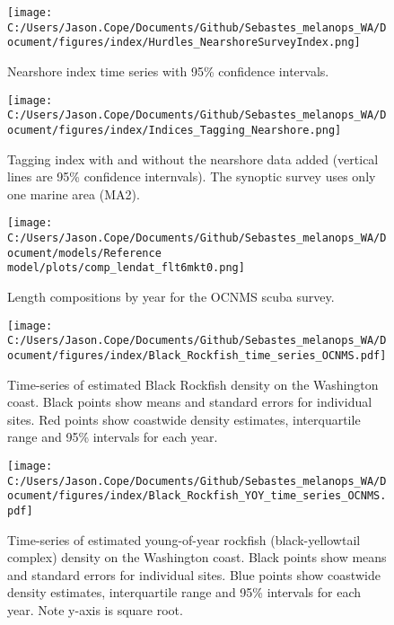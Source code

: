 \documentclass[11pt,
  letterpaper,
]{article}
\begin{document}
\pagebreak

\begin{figure}
{\centering
\texttt{[image: C:/Users/Jason.Cope/Documents/Github/Sebastes\_melanops\_WA/Document/figures/index/Hurdles\_NearshoreSurveyIndex.png]}
}
\caption{Nearshore index time series with 95\% confidence intervals.\label{fig:nearshore-index}}
\end{figure}

\pagebreak

\begin{figure}
{\centering
\texttt{[image: C:/Users/Jason.Cope/Documents/Github/Sebastes\_melanops\_WA/Document/figures/index/Indices\_Tagging\_Nearshore.png]}
}
\caption{Tagging index with and without the nearshore data added (vertical lines are 95\% confidence internvals). The synoptic survey uses only one marine area (MA2).\label{fig:tag-nearshore-index}}
\end{figure}

\pagebreak

\begin{figure}
{\centering
\texttt{[image: C:/Users/Jason.Cope/Documents/Github/Sebastes\_melanops\_WA/Document/models/Reference model/plots/comp\_lendat\_flt6mkt0.png]}
}
\caption{Length compositions by year for the OCNMS scuba survey.\label{fig:ocnms-ltcomps}}
\end{figure}

\begin{figure}
{\centering
\texttt{[image: C:/Users/Jason.Cope/Documents/Github/Sebastes\_melanops\_WA/Document/figures/index/Black\_Rockfish\_time\_series\_OCNMS.pdf]}
}
\caption{Time-series of estimated Black Rockfish density on the Washington coast. Black points show means and standard errors for individual sites. Red points show coastwide density estimates, interquartile range and 95\% intervals for each year.\label{fig:ocnms-adult-index}}
\end{figure}

\begin{figure}
{\centering
\texttt{[image: C:/Users/Jason.Cope/Documents/Github/Sebastes\_melanops\_WA/Document/figures/index/Black\_Rockfish\_YOY\_time\_series\_OCNMS.pdf]}
}
\caption{Time-series of estimated young-of-year rockfish (black-yellowtail complex) density on the Washington coast. Black points show means and standard errors for individual sites. Blue points show coastwide density estimates, interquartile range and 95\% intervals for each year. Note y-axis is square root.\label{fig:ocnms-yoy-index}}
\end{figure}
\end{document}
